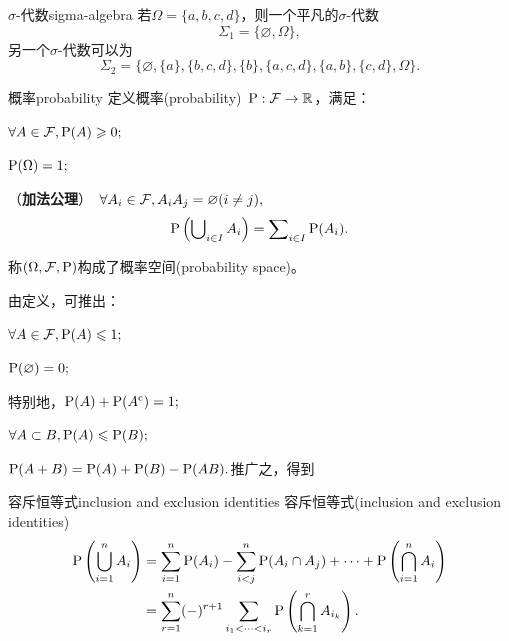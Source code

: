 \begin{example}{$\sigma$-代数}{sigma-algebra}
	若$\Omega=\{a,b,c,d\}$，则一个平凡的$\sigma$-代数
	\[
		\Sigma_1=\{\varnothing, \Omega\},
	\]
	另一个$\sigma$-代数可以为
	\[
		\Sigma_2=\{\varnothing,\{a\},\{b,c,d\},\{b\},\{a,c,d\},\{a,b\},\{c,d\},\Omega\}.
	\]
\end{example}
\begin{definition}{概率}{probability}
	定义概率(probability)~$\P:\cF\to\RR$，满足：
	\begin{compactenum}
		\item $\forall A\in\cF,\P(A)\geqslant 0;$
		\item $\P (\Omega)=1;$
		\item （\textbf{加法公理}）~$\forall A_i \in \cF,A_iA_j=\varnothing(i\neq j),$
		\begin{equation}
			\P\kh{\bigcup\nolimits_{i\in I} A_i}=\sum\nolimits_{i\in I}\P(A_i).
		\end{equation}
	\end{compactenum}
	称$(\Omega,\cF,\P)$构成了概率空间(probability space)。
\end{definition}
\begin{corollary}
	由定义，可推出：
	\begin{compactenum}
		\item $\forall A\in\cF,\P(A)\leqslant 1;$
		\item $\P(\varnothing)=0;$
		\item 
		特别地，$\P(A)+\P(A\c)=1;$
		\item $\forall A\subset B,\P(A)\leqslant\P(B);$
		\item $\P(A+B)=\P(A)+\P(B)-\P(AB).$推广之，得到
	\end{compactenum}
\end{corollary}
\begin{theorem}{容斥恒等式}{inclusion and exclusion identities}
	容斥恒等式(inclusion and exclusion identities)
	\begin{align}\notag
		\P\kh{\bigcup_{i=1}^nA_i}&=\sum_{i=1}^n\P(A_i)-\sum_{i<j}^n\P(A_i\cap A_j)+\cdots+\P\kh{\bigcap_{i=1}^nA_i}\\
		&=\sum_{r=1}^n(-)^{r+1}\sum_{i_1<\cdots<i_r}\P\kh{\bigcap_{k=1}^rA_{i_k}}.
	\end{align}
\end{theorem}
